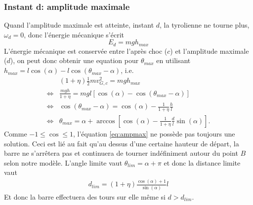 \subsubsection*{Instant d: amplitude maximale}
Quand l'amplitude maximale est atteinte, instant $d$, la tyrolienne ne tourne plus, $\omega_{d}=0$, donc l'énergie mécanique s'écrit
\begin{equation}
    E_{d} = mgh_{max}
\end{equation}
L'énergie mécanique est conservée entre l'après choc ($c$) et l'amplitude maximale ($d$), on peut donc obtenir une equation pour $\theta_{max}$ en utilisant $h_{max}=l \cos(\alpha)-l\cos(\theta_{max}-\alpha)$, i.e.
\begin{align}
    &(1+\eta)\frac{1}{2}mv_{G,c}^2 = mgh_{max} \nonumber\\
    \Leftrightarrow&\frac{mgh}{1+\eta} =mg l [\cos(\alpha)-\cos(\theta_{max}-\alpha)] \nonumber\\
    \Leftrightarrow&\cos(\theta_{max}-\alpha) = \cos(\alpha) - \frac{1}{1+\eta}\frac{h}{l}\nonumber\\
    \Leftrightarrow&\theta_{max}=\alpha+\arccos\left[\cos(\alpha) - \frac{1}{1+\eta}\frac{d}{l}\sin(\alpha)\right].
    \label{eq:ampmax}
\end{align}
Comme $-1\leq \cos \leq 1$, l'équation \eqref{eq:ampmax} ne possède pas toujours une solution.
Ceci est lié au fait qu'au dessus d'une certaine hauteur de départ, la barre ne s'arrêtera pas et continuera de tourner indéfiniment autour du point $B$ selon notre modèle.
L'angle limite vaut $\theta_{lim}=\alpha+\pi$ et donc la distance limite vaut
\begin{align}
    d_{lim} = (1+\eta) \frac{\cos(\alpha) + 1}{\sin(\alpha)}l
    \label{eq:hlim}
\end{align}
Et donc la barre effectuera des tours sur elle même si $d>d_{lim}$.


